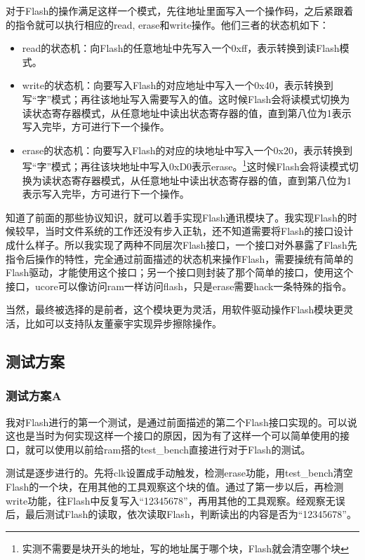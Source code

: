 对于Flash的操作满足这样一个模式，先往地址里面写入一个操作码，之后紧跟着的指令就可以执行相应的read, erase和write操作。他们三者的状态机如下：
\begin{itemize}
\item read的状态机：向Flash的任意地址中先写入一个0xff，表示转换到读Flash模式。
\item write的状态机：向要写入Flash的对应地址中写入一个0x40，表示转换到写“字”模式；再往该地址写入需要写入的值。这时候Flash会将读模式切换为读状态寄存器模式，从任意地址中读出状态寄存器的值，直到第八位为1表示写入完毕，方可进行下一个操作。
\item erase的状态机：向要写入Flash的对应的块地址中写入一个0x20，表示转换到写“字”模式；再往该块地址中写入0xD0表示erase。\footnote{实测不需要是块开头的地址，写的地址属于哪个块，Flash就会清空哪个块}这时候Flash会将读模式切换为读状态寄存器模式，从任意地址中读出状态寄存器的值，直到第八位为1表示写入完毕，方可进行下一个操作。
\end{itemize}

知道了前面的那些协议知识，就可以着手实现Flash通讯模块了。我实现Flash的时候较早，当时文件系统的工作还没有步入正轨，还不知道需要将Flash的接口设计成什么样子。所以我实现了两种不同层次Flash接口，一个接口对外暴露了Flash先指令后操作的特性，完全通过前面描述的状态机来操作Flash，需要操统有简单的Flash驱动，才能使用这个接口；另一个接口则封装了那个简单的接口，使用这个接口，ucore可以像访问ram一样访问flash，只是erase需要hack一条特殊的指令。

当然，最终被选择的是前者，这个模块更为灵活，用软件驱动操作Flash模块更灵活，比如可以支持队友董豪宇实现异步擦除操作。

\subsection{测试方案}
\subsubsection{测试方案A}

我对Flash进行的第一个测试，是通过前面描述的第二个Flash接口实现的。可以说这也是当时为何实现这样一个接口的原因，因为有了这样一个可以简单使用的接口，就可以使用以前给ram搭的test\_bench直接进行对于Flash的测试。

测试是逐步进行的。先将clk设置成手动触发，检测erase功能，用test\_bench清空Flash的一个块，在用其他的工具观察这个块的值。通过了第一步以后，再检测write功能，往Flash中反复写入“12345678”，再用其他的工具观察。经观察无误后，最后测试Flash的读取，依次读取Flash，判断读出的内容是否为“12345678”。

